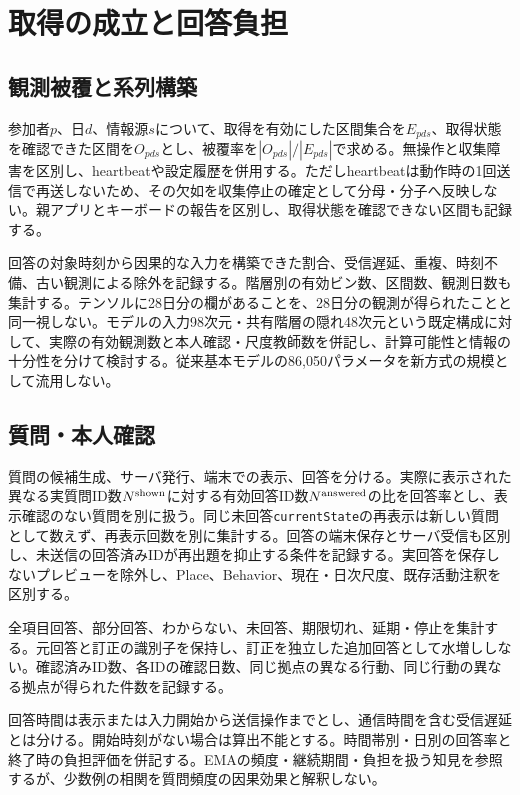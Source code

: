 \section{取得の成立と回答負担}

\subsection{観測被覆と系列構築}

参加者\(p\)、日\(d\)、情報源\(s\)について、取得を有効にした区間集合を\(E_{pds}\)、取得状態を確認できた区間を\(O_{pds}\)とし、被覆率を\(|O_{pds}|/|E_{pds}|\)で求める。無操作と収集障害を区別し、heartbeatや設定履歴を併用する。ただしheartbeatは動作時の1回送信で再送しないため、その欠如を収集停止の確定として分母・分子へ反映しない。親アプリとキーボードの報告を区別し、取得状態を確認できない区間も記録する。

回答の対象時刻から因果的な入力を構築できた割合、受信遅延、重複、時刻不備、古い観測による除外を記録する。階層別の有効ビン数、区間数、観測日数も集計する。テンソルに28日分の欄があることを、28日分の観測が得られたことと同一視しない。モデルの入力98次元・共有階層の隠れ48次元という既定構成に対して、実際の有効観測数と本人確認・尺度教師数を併記し、計算可能性と情報の十分性を分けて検討する。従来基本モデルの86,050パラメータを新方式の規模として流用しない。

\subsection{質問・本人確認}

質問の候補生成、サーバ発行、端末での表示、回答を分ける。実際に表示された異なる実質問ID数\(N^{\rm shown}\)に対する有効回答ID数\(N^{\rm answered}\)の比を回答率とし、表示確認のない質問を別に扱う。同じ未回答\texttt{currentState}の再表示は新しい質問として数えず、再表示回数を別に集計する。回答の端末保存とサーバ受信も区別し、未送信の回答済みIDが再出題を抑止する条件を記録する。実回答を保存しないプレビューを除外し、Place、Behavior、現在・日次尺度、既存活動注釈を区別する。

全項目回答、部分回答、わからない、未回答、期限切れ、延期・停止を集計する。元回答と訂正の識別子を保持し、訂正を独立した追加回答として水増ししない。確認済みID数、各IDの確認日数、同じ拠点の異なる行動、同じ行動の異なる拠点が得られた件数を記録する。

回答時間は表示または入力開始から送信操作までとし、通信時間を含む受信遅延とは分ける。開始時刻がない場合は算出不能とする。時間帯別・日別の回答率と終了時の負担評価を併記する。EMAの頻度・継続期間・負担を扱う知見を参照するが、少数例の相関を質問頻度の因果効果と解釈しない\autocite{shiffman2008ema,eisele2022burden}。

